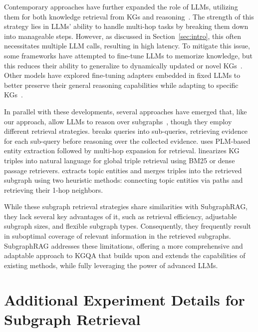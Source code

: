 Contemporary approaches have further expanded the role of LLMs, utilizing them for both knowledge retrieval from KGs and reasoning~\citep{kim2023kg, gao2024two, wang2024knowledge, guo2024knowledgenavigator, ma2024think, sun2024think, jiang2024kg, jin2024graph}. The strength of this strategy lies in LLMs' ability to handle multi-hop tasks by breaking them down into manageable steps. However, as discussed in Section~\ref{sec:intro}, this often necessitates multiple LLM calls, resulting in high latency. To mitigate this issue, some frameworks have attempted to fine-tune LLMs to memorize knowledge, but this reduces their ability to generalize to dynamically updated or novel KGs~\citep{luo2024rog, mavromatis2024gnn}. Other models have explored fine-tuning adapters embedded in fixed LLMs to better preserve their general reasoning capabilities while adapting to specific KGs~\citep{he2024g,gao2024two,hu2024grag}.

In parallel with these developments, several approaches have emerged that, like our approach, allow LLMs to reason over subgraphs~\citep{kim2023kg,liu2024explore,li2023graph,guo2024knowledgenavigator,wu2023retrieve,li2024graph,wen2023mindmap}, though they employ different retrieval strategies. \citet{kim2023kg} breaks queries into sub-queries, retrieving evidence for each sub-query before reasoning over the collected evidence. \citet{guo2024knowledgenavigator} uses PLM-based entity extraction followed by multi-hop expansion for retrieval. \citet{li2023graph} linearizes KG triples into natural language for global triple retrieval using BM25 or dense passage retrievers. \citet{wen2023mindmap} extracts topic entities and merges triples into the retrieved subgraph using two heuristic methods: connecting topic entities via paths and retrieving their 1-hop neighbors. 

While these subgraph retrieval strategies share similarities with SubgraphRAG, they lack several key advantages of it, such as retrieval efficiency, adjustable subgraph sizes, and flexible subgraph types. Consequently, they frequently result in suboptimal coverage of relevant information in the retrieved subgraphs. SubgraphRAG addresses these limitations, offering a more comprehensive and adaptable approach to KGQA that builds upon and extends the capabilities of existing methods, while fully leveraging the power of advanced LLMs.

\section{Additional Experiment Details for Subgraph Retrieval}

